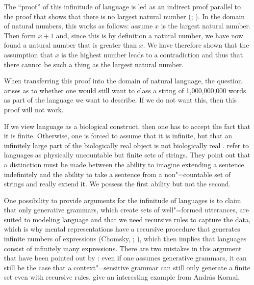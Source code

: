 The ``proof'' of this infinitude of language is led as an indirect proof parallel to the proof that shows
that there is no largest natural number (\citealp[--106]{Bierwisch66a}; \citealp[]{Pinker94a}). In the domain of natural numbers, this works
as follows: assume $x$ is the largest natural number. Then form $x + 1$ and, since this is by
definition a natural number, we have now found a natural number that is greater than $x$. We have
therefore shown that the assumption that $x$ is the highest number leads to a contradiction and thus
that there cannot be such a thing as the largest natural number. 

When transferring this proof into the domain of natural language, the question arises as to whether one would still want to class 
a string of 1,000,000,000 words as part of the language we want to describe. If we do not want this, then this proof will not work.

If we view language as a biological construct, then one has to accept the fact that it is finite. Otherwise, one is forced to assume
that it is infinite, but that an infinitely large part of the biologically real object is not biologically real \citep[]{Postal2009a}. \citet{LL2011a} refer to languages as physically uncountable but finite sets of strings.
They point out that a distinction must be made between the ability to imagine extending a sentence indefinitely and the ability
to take a sentence from a non"=countable set of strings and really extend it. We possess the first ability but not the second.

One possibility to provide arguments for the infinitude of languages is to claim that only generative grammars,
which create sets of well"=formed utterances, are suited to modeling language and that we need recursive rules to capture the data, which
is why mental representations have a recursive procedure that generates infinite numbers of expressions (Chomsky, \citeyear[]{Chomsky56a-u}; \citeyear[--87]{Chomsky2002a-u}), which then implies that languages consist of infinitely many expressions.
There are two mistakes in this argument that have been pointed out by \citet{PS2010a}: 
even if one assumes generative grammars, it can still be the case that a context"=sensitive grammar can still only generate a finite set even with 
recursive rules. \citet[120--121]{PS2010a} give an interesting example from Andr{\'a}s
Kornai.

